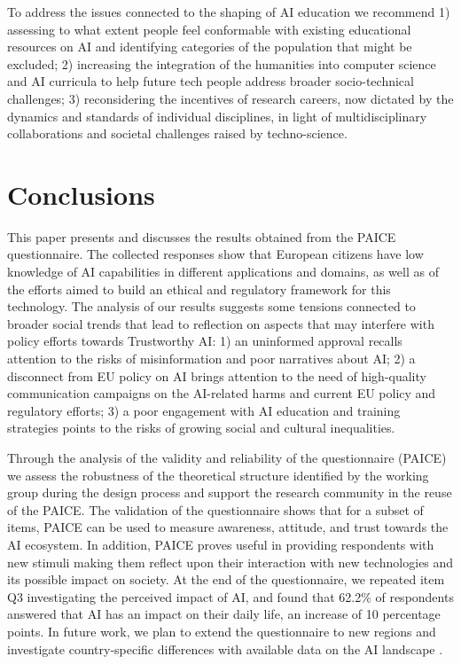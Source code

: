 \documentclass{article}
\begin{document}
To address the issues connected to the shaping of AI education we recommend 1) assessing to what extent people feel conformable with existing educational resources on AI and identifying categories of the population that might be excluded; 2) increasing the integration of the humanities into computer science and AI curricula to help future tech people address broader socio-technical challenges; 3) reconsidering the incentives of research careers, now dictated by the dynamics and standards of individual disciplines, in light of multidisciplinary collaborations and societal challenges raised by techno-science.

\section{Conclusions}
\label{conclude}
This paper presents and discusses the results obtained from the PAICE questionnaire. 
The collected responses show that European citizens have low knowledge of AI capabilities in different applications and domains, as well as of the efforts aimed to build an ethical and regulatory framework for this technology. The analysis of our results suggests some tensions connected to broader social trends that lead to reflection on aspects that may interfere with policy efforts towards Trustworthy AI: 1) an uninformed approval recalls attention to the risks of misinformation and poor narratives about AI; 2) a disconnect from EU policy on AI brings attention to the need of high-quality communication campaigns on the AI-related harms and current EU policy and regulatory efforts; 3) a poor engagement with AI education and training strategies points to the risks of growing social and cultural inequalities.

Through the analysis of the validity and reliability of the questionnaire (PAICE) we assess the robustness of the theoretical structure identified by the working group during the design process and support the research community in the reuse of the PAICE. The validation of the questionnaire shows that for a subset of items, PAICE can be used to measure awareness, attitude, and trust towards the AI ecosystem.
In addition, PAICE proves useful in providing respondents with new stimuli making them reflect upon their interaction with new technologies and its possible impact on society. At the end of the questionnaire, we repeated item Q3 investigating the perceived impact of AI, and found that 62.2\% of respondents answered that AI has an impact on their daily life, an increase of 10 percentage points.
In future work, we plan to extend the questionnaire to new regions and investigate country-specific differences with available data on the AI landscape \cite{AIwatch2021}.
\end{document}
